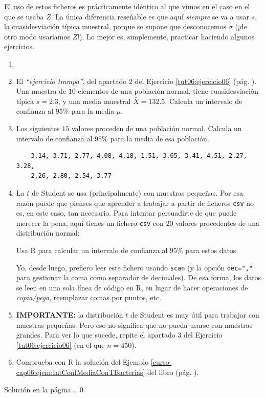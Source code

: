 \documentclass[10pt,a4paper]{article}\usepackage[]{graphicx}\usepackage[]{color}
\begin{document}
El uso de estos ficheros es prácticamente idéntico al que vimos en el caso en el que se usaba $Z$. La  única diferencia reseñable es que aquí {\em siempre} se va a usar $s$, la cuasidesviación típica muestral, porque se supone que desconocemos $\sigma$ (¡de otro modo usaríamos $Z$!). Lo mejor es, simplemente, practicar haciendo algunos ejercicios.

\begin{ejercicio}
\label{tut06:ejercicio14}
\begin{enumerate}
  \item[]
  \item El {\em ``ejercicio trampa''}, del apartado 2 del Ejercicio \ref{tut06:ejercicio06} (pág. \pageref{tut06:ejercicio06}). Una muestra de $10$ elementos de una población normal, tiene cuasidesviación típica $s=2.3$, y una media muestral $\bar X=132.5$. Calcula un intervalo  de confianza al $95\%$ para la media $\mu$.

  \item Los siguientes $15$ valores proceden de una población normal. Calcula un intervalo de confianza al $95\%$ para la media de esa población.
    \begin{verbatim}
    3.14, 3.71, 2.77, 4.08, 4.18, 1.51, 3.65, 3.41, 4.51, 2.27, 3.28,
    2.26, 2.80, 2.54, 3.77
    \end{verbatim}

  \item La $t$ de Student se usa (principalmente) con muestras pequeñas. Por esa razón puede que pienses que aprender a trabajar a partir de ficheros {\tt csv} no es, en este caso, tan necesario.  Para intentar persuadirte de que puede merecer la pena, aquí tienes un fichero {\tt csv} con $20$ valores procedentes de una distribución normal:
      \begin{center}
      \end{center}
      Usa R para calcular un intervalo de confianza al $95\%$ para estos datos.

      Yo, desde luego, prefiero leer este fichero usando {\tt scan} (y la opción \verb/dec=","/ para gestionar la coma como separador de decimales). De esa forma, los datos se leen en una sola línea de código en R, en lugar de hacer operaciones de {\em copia/pega}, reemplazar comas por puntos, etc.

  \item {\bf IMPORTANTE:} la distribución $t$ de Student es muy útil para trabajar con muestras pequeñas. Pero eso no significa que no pueda usarse con muestras grandes. Para ver lo que sucede, repite el apartado 3 del Ejercicio \ref{tut06:ejercicio06} (en el que $n=450$).

  \item Comprueba con R la solución del Ejemplo \ref{curso-cap06:ejem:IntConfMediaConTBacterias} del libro (pág. \pageref{curso-cap06:ejem:IntConfMediaConTBacterias}).

\end{enumerate}
Solución en la página \pageref{tut06:ejercicio14:sol}.
\qed
\end{ejercicio}
\end{document}
